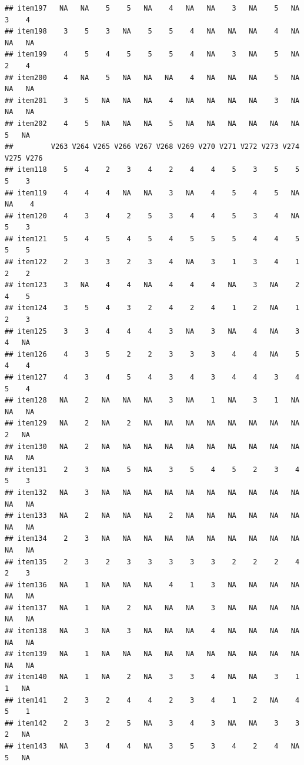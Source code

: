 \documentclass[
  man]{apa6}
\begin{document}
\begin{verbatim}
## item197   NA   NA    5    5   NA    4   NA   NA    3   NA    5   NA    3    4
## item198    3    5    3   NA    5    5    4   NA   NA   NA    4   NA   NA   NA
## item199    4    5    4    5    5    5    4   NA    3   NA    5   NA    2    4
## item200    4   NA    5   NA   NA   NA    4   NA   NA   NA    5   NA   NA   NA
## item201    3    5   NA   NA   NA    4   NA   NA   NA   NA    3   NA   NA   NA
## item202    4    5   NA   NA   NA    5   NA   NA   NA   NA   NA   NA    5   NA
##         V263 V264 V265 V266 V267 V268 V269 V270 V271 V272 V273 V274 V275 V276
## item118    5    4    2    3    4    2    4    4    5    3    5    5    5    3
## item119    4    4    4   NA   NA    3   NA    4    5    4    5   NA   NA    4
## item120    4    3    4    2    5    3    4    4    5    3    4   NA    5    3
## item121    5    4    5    4    5    4    5    5    5    4    4    5    5    5
## item122    2    3    3    2    3    4   NA    3    1    3    4    1    2    2
## item123    3   NA    4    4   NA    4    4    4   NA    3   NA    2    4    5
## item124    3    5    4    3    2    4    2    4    1    2   NA    1    2    3
## item125    3    3    4    4    4    3   NA    3   NA    4   NA    3    4   NA
## item126    4    3    5    2    2    3    3    3    4    4   NA    5    4    4
## item127    4    3    4    5    4    3    4    3    4    4    3    4    5    4
## item128   NA    2   NA   NA   NA    3   NA    1   NA    3    1   NA   NA   NA
## item129   NA    2   NA    2   NA   NA   NA   NA   NA   NA   NA   NA    2   NA
## item130   NA    2   NA   NA   NA   NA   NA   NA   NA   NA   NA   NA   NA   NA
## item131    2    3   NA    5   NA    3    5    4    5    2    3    4    5    3
## item132   NA    3   NA   NA   NA   NA   NA   NA   NA   NA   NA   NA   NA   NA
## item133   NA    2   NA   NA   NA    2   NA   NA   NA   NA   NA   NA   NA   NA
## item134    2    3   NA   NA   NA   NA   NA   NA   NA   NA   NA   NA   NA   NA
## item135    2    3    2    3    3    3    3    3    2    2    2    4    2    3
## item136   NA    1   NA   NA   NA    4    1    3   NA   NA   NA   NA   NA   NA
## item137   NA    1   NA    2   NA   NA   NA    3   NA   NA   NA   NA   NA   NA
## item138   NA    3   NA    3   NA   NA   NA    4   NA   NA   NA   NA   NA   NA
## item139   NA    1   NA   NA   NA   NA   NA   NA   NA   NA   NA   NA   NA   NA
## item140   NA    1   NA    2   NA    3    3    4   NA   NA    3    1    1   NA
## item141    2    3    2    4    4    2    3    4    1    2   NA    4    5    1
## item142    2    3    2    5   NA    3    4    3   NA   NA    3    3    2   NA
## item143   NA    3    4    4   NA    3    5    3    4    2    4   NA    5   NA

\end{verbatim}
\end{document}
